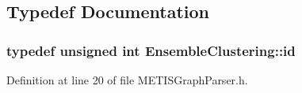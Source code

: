 \subsection{Typedef Documentation}
\hypertarget{namespace_ensemble_clustering_a3228848abf8dfd6602f3b08dd459ea20}{
\subsubsection[{id}]{\setlength{\rightskip}{0pt plus 5cm}typedef unsigned int {\bf Ensemble\-Clustering\-::id}}}\label{namespace_ensemble_clustering_a3228848abf8dfd6602f3b08dd459ea20}


Definition at line 20 of file M\-E\-T\-I\-S\-Graph\-Parser.\-h.

